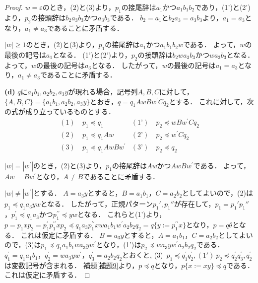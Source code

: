 \begin{proof}
$w=\varepsilon$のとき，(2)と(3)より，$p_{1}$の接尾辞は$a_{1}$かつ$a_{1}b_{1}b_{2}$であり，(1')と(2')より，$p_{2}$の接頭辞は$b_{2}a_{3}b_{3}$かつ$a_{3}b_{3}$である．
$b_{2}=a_{1}$と$b_{2}a_{3}=a_{3}b_{3}$より，$a_{1}=a_{3}$となり，$a_{1} \ne a_{3}$であることに矛盾する．

$|w| \ge 1$のとき，(2)と(3)より，$p_{1}$の接尾辞は$a_{1}$かつ$a_{1}b_{1}b_{2}w$である．
よって，$w$の最後の記号は$a_{1}$となる．
(1')と(2')より，$p_{2}$の接頭辞は$b_{2}wa_{3}b_{3}$かつ$wa_{3}b_{3}$となる．
よって，$w$の最後の記号は$a_{3}$となる．
したがって，$w$の最後の記号は$a_{1}=a_{3}$となり，$a_{1} \ne a_{3}$であることに矛盾する．
\smallskip

\textbf{(d)} $q$に$a_{1}b_{1}, a_{2}b_{2}, a_{3}y$が現れる場合，記号列$A,B,C$に対して，$\{ A, B, C \} = \{ a_{1}b_{1}, a_{2}b_{2}, a_{3}y \}$とおき，$q=q_{1}AwBw^{\prime}Cq_{2}$とする．
これに対して，次の式が成り立っているものとする．
\begin{align*}
(1)~& p_{1} \preceq q_{1} & (\text{1'})~& p_{2} \preceq wBw^{\prime}Cq_{2} \\
(2)~& p_{1} \preceq q_{1}Aw & (\text{2'})~& p_{2} \preceq w^{\prime}Cq_{2} \\
(3)~& p_{1} \preceq q_{1}AwBw^{\prime} & (\text{3'})~& p_{2} \preceq q_{2}
\end{align*}

$|w|=|w^{\prime}|$のとき，(2)と(3)より，$p_{1}$の接尾辞は$Aw$かつ$AwBw^{\prime}$である．
よって，$Aw=Bw^{\prime}$となり，$A \ne B$であることに矛盾する．

$|w| \ne |w^{\prime}|$とする．
$A=a_{3}y$とすると，$B=a_{1}b_{1}$，$C=a_{2}b_{2}$としてよいので，(2)は$p_{1} \preceq q_{1}a_{3}yw$となる．
したがって，正規パターン$p_{1}', p_{1}''$が存在して，$p_{1}=p_{1}'p_{1}''$，$p_{1}^{\prime} \preceq q_{1}a_{3}$かつ$p_{1}^{\prime\prime} \preceq yw$となる．
これらと(1')より，$p=p_{1}xp_{2}=p_{1}^{\prime}p_{1}^{\prime\prime}xp_{2}\preceq q_{1}a_{3}p_{1}^{\prime\prime}xwa_{1}b_{1}w^{\prime}a_{2}b_{2}q_{2}=q \{ y := p_{1}^{\prime\prime}x \}$となり，$p=q \theta$となる．
これは仮定に矛盾する．
$B=a_{3}y$とすると，$A=a_{1}b_{1}$，$C=a_{2}b_{2}$としてよいので，(3)は$p_{1} \preceq q_{1}a_{1}b_{1}wa_{3}yw^{\prime}$となり，(1')は$p_{2} \preceq wa_{3}yw^{\prime}a_{2}b_{2}q_{2}$である．$q_{1}^{\prime}=q_{1}a_{1}b_{1}$，$q_{2}^{\prime}=wa_{3}yw^{\prime}$，$q_{3}^{\prime}=a_{2}b_{2}q_{2}$とおくと, (3)~$p_{1} \preceq q_{1}^{\prime}q_{2}^{\prime}, (1')~p_{2} \preceq q_{2}^{\prime}q_{3}^{\prime}, q_{2}^{\prime}$は変数記号が含まれる．
補題\ref{補題9}より，$p \preceq q$となり，$p \{ x := xy \} \preceq q$である．
これは仮定に矛盾する．


\end{proof}
